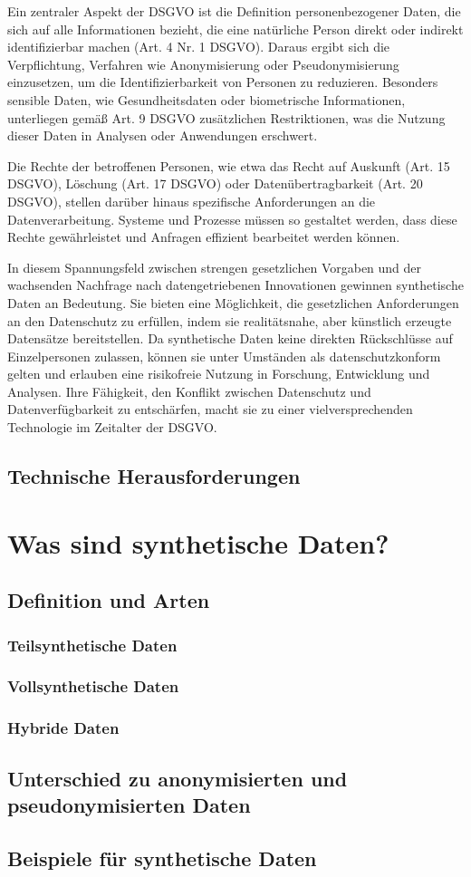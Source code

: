 \documentclass[../main.tex]{subfiles}
\begin{document}
Ein zentraler Aspekt der DSGVO ist die Definition personenbezogener Daten, die sich auf alle Informationen bezieht, die eine natürliche Person direkt oder indirekt identifizierbar machen (Art. 4 Nr. 1 DSGVO). Daraus ergibt sich die Verpflichtung, Verfahren wie Anonymisierung oder Pseudonymisierung einzusetzen, um die Identifizierbarkeit von Personen zu reduzieren. Besonders sensible Daten, wie Gesundheitsdaten oder biometrische Informationen, unterliegen gemäß Art. 9 DSGVO zusätzlichen Restriktionen, was die Nutzung dieser Daten in Analysen oder Anwendungen erschwert.

Die Rechte der betroffenen Personen, wie etwa das Recht auf Auskunft (Art. 15 DSGVO), Löschung (Art. 17 DSGVO) oder Datenübertragbarkeit (Art. 20 DSGVO), stellen darüber hinaus spezifische Anforderungen an die Datenverarbeitung. Systeme und Prozesse müssen so gestaltet werden, dass diese Rechte gewährleistet und Anfragen effizient bearbeitet werden können.

In diesem Spannungsfeld zwischen strengen gesetzlichen Vorgaben und der wachsenden Nachfrage nach datengetriebenen Innovationen gewinnen synthetische Daten an Bedeutung. Sie bieten eine Möglichkeit, die gesetzlichen Anforderungen an den Datenschutz zu erfüllen, indem sie realitätsnahe, aber künstlich erzeugte Datensätze bereitstellen. Da synthetische Daten keine direkten Rückschlüsse auf Einzelpersonen zulassen, können sie unter Umständen als datenschutzkonform gelten und erlauben eine risikofreie Nutzung in Forschung, Entwicklung und Analysen. Ihre Fähigkeit, den Konflikt zwischen Datenschutz und Datenverfügbarkeit zu entschärfen, macht sie zu einer vielversprechenden Technologie im Zeitalter der DSGVO.

\subsection{Technische Herausforderungen}
\section{Was sind synthetische Daten?}
\subsection{Definition und Arten}
\subsubsection{Teilsynthetische Daten}
\subsubsection{Vollsynthetische Daten}
\subsubsection{Hybride Daten}
\subsection{Unterschied zu anonymisierten und pseudonymisierten Daten}
\subsection{Beispiele für synthetische Daten}
\end{document}
